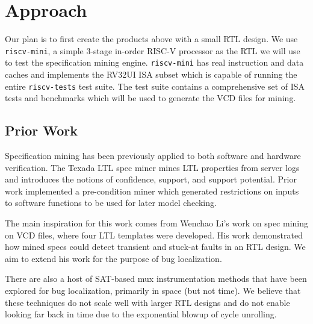 \documentclass[acmlarge,11pt]{acmart}
\begin{document}
\section{Approach}
Our plan is to first create the products above with a small RTL design.
We use \texttt{riscv-mini}\cite{riscv-mini}, a simple 3-stage in-order RISC-V processor as the RTL we will use to test the specification mining engine.
\texttt{riscv-mini} has real instruction and data caches and implements the RV32UI ISA subset which is capable of running the entire \texttt{riscv-tests}\cite{riscv-tests} test suite.
The test suite contains a comprehensive set of ISA tests and benchmarks which will be used to generate the VCD files for mining.

\subsection{Prior Work}
Specification mining has been previously applied to both software and hardware verification.
The Texada LTL spec miner\cite{Lemieux_2015} mines LTL properties from server logs and introduces the notions of confidence, support, and support potential.
Prior work\cite{Yamaguchi_2016} implemented a pre-condition miner which generated restrictions on inputs to software functions to be used for later model checking.

The main inspiration for this work comes from Wenchao Li's\cite{Li_2010}\cite{Li_2014} work on spec mining on VCD files, where four LTL templates were developed.
His work demonstrated how mined specs could detect transient and stuck-at faults in an RTL design.
We aim to extend his work for the purpose of bug localization.

There are also a host of SAT-based mux instrumentation methods\cite{Mirzaeian_2008}\cite{Smith_2005}\cite{Chang_2007} that have been explored for bug localization, primarily in space (but not time).
We believe that these techniques do not scale well with larger RTL designs and do not enable looking far back in time due to the exponential blowup of cycle unrolling.
\end{document}
